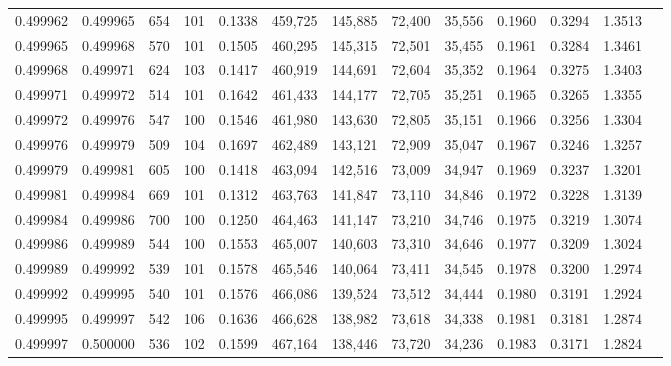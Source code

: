 \begin{tabular}{rrrrrrrrrrrrr}
0.499962 & 0.499965 &   654 & 101 &                                     0.1338 & 459,725 & 145,885 &  72,400 &  35,556 & 0.1960 & 0.3294 & 1.3513 \\
0.499965 & 0.499968 &   570 & 101 &                                     0.1505 & 460,295 & 145,315 &  72,501 &  35,455 & 0.1961 & 0.3284 & 1.3461 \\
0.499968 & 0.499971 &   624 & 103 &                                     0.1417 & 460,919 & 144,691 &  72,604 &  35,352 & 0.1964 & 0.3275 & 1.3403 \\
0.499971 & 0.499972 &   514 & 101 &                                     0.1642 & 461,433 & 144,177 &  72,705 &  35,251 & 0.1965 & 0.3265 & 1.3355 \\
0.499972 & 0.499976 &   547 & 100 &                                     0.1546 & 461,980 & 143,630 &  72,805 &  35,151 & 0.1966 & 0.3256 & 1.3304 \\
0.499976 & 0.499979 &   509 & 104 &                                     0.1697 & 462,489 & 143,121 &  72,909 &  35,047 & 0.1967 & 0.3246 & 1.3257 \\
0.499979 & 0.499981 &   605 & 100 &                                     0.1418 & 463,094 & 142,516 &  73,009 &  34,947 & 0.1969 & 0.3237 & 1.3201 \\
0.499981 & 0.499984 &   669 & 101 &                                     0.1312 & 463,763 & 141,847 &  73,110 &  34,846 & 0.1972 & 0.3228 & 1.3139 \\
0.499984 & 0.499986 &   700 & 100 &                                     0.1250 & 464,463 & 141,147 &  73,210 &  34,746 & 0.1975 & 0.3219 & 1.3074 \\
0.499986 & 0.499989 &   544 & 100 &                                     0.1553 & 465,007 & 140,603 &  73,310 &  34,646 & 0.1977 & 0.3209 & 1.3024 \\
0.499989 & 0.499992 &   539 & 101 &                                     0.1578 & 465,546 & 140,064 &  73,411 &  34,545 & 0.1978 & 0.3200 & 1.2974 \\
0.499992 & 0.499995 &   540 & 101 &                                     0.1576 & 466,086 & 139,524 &  73,512 &  34,444 & 0.1980 & 0.3191 & 1.2924 \\
0.499995 & 0.499997 &   542 & 106 &                                     0.1636 & 466,628 & 138,982 &  73,618 &  34,338 & 0.1981 & 0.3181 & 1.2874 \\
0.499997 & 0.500000 &   536 & 102 &                                     0.1599 & 467,164 & 138,446 &  73,720 &  34,236 & 0.1983 & 0.3171 & 1.2824 \\

\end{tabular}
